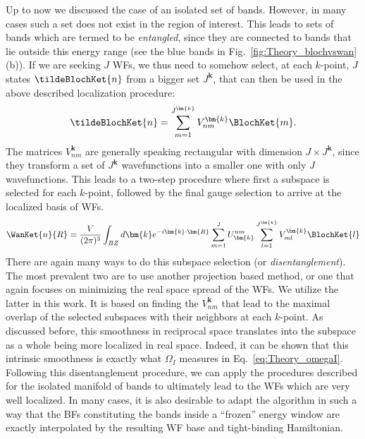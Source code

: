 Up to now we discussed the case of an isolated set of bands.
However, in many cases such a set does not exist in the region of interest.
This leads to sets of bands which are termed to be {\it entangled}, since they are connected to bands that lie outside this energy range (see the blue bands in Fig.~\ref{fig:Theory_blochvswan}(b)).
If we are seeking $J$ WFs, we thus need to somehow select, at each $k$-point, $J$ states $\tildeBlochKet{n}$ from a bigger set $J^{\bm{k}}$, that can then be used in the above described localization procedure:
\begin{equation}
	\tildeBlochKet{n} = \sum_{m=1}^{J^{\bm{k}}}V_{nm}^{\bm{k}} \BlochKet{m}.
\end{equation}
The matrices $V_{nm}^{\bm{k}}$ are generally speaking rectangular with dimension $J\times J^{\bm{k}}$, since they transform a set of $J^{\bm{k}}$ wavefunctions into a smaller one with only $J$ wavefunctions.
This leads to a two-step procedure where first a subspace is selected for each $k$-point, followed by the final gauge selection to arrive at the localized basis of WFs.
\begin{equation}
	\WanKet{n}{R} = \frac{V}{(2\pi)^3} \int_{BZ} d\bm{k} e^{-i \bm{k} \cdot \bm{R}} \sum_{m=1}^J U^{nm}_{\bm{k}} \sum_{l=1}^{J^{\bm{k}}} V_{ml}^{\bm{k}} \BlochKet{l}
\end{equation}
There are again many ways to do this subspace selection (or {\it disentanglement}).
The most prevalent two are to use another projection based method, or one that again focuses on minimizing the real space spread of the WFs.
We utilize the latter in this work.
It is based on finding the $V_{nm}^{\bm{k}}$ that lead to the maximal overlap of the selected subspaces with their neighbors at each $k$-point.
As discussed before, this smoothness in reciprocal space translates into the subspace as a whole being more localized in real space.
Indeed, it can be shown \cite{Marzari2012} that this intrinsic smoothness is exactly what $\Omega_I$ measures in Eq.~\eqref{eq:Theory_omegaI}. 
Following this disentanglement procedure, we can apply the procedures described for the isolated manifold of bands to ultimately lead to the WFs which are very well localized.
In many cases, it is also desirable to adapt the algorithm in such a way that the BFs constituting the bands inside a ``frozen'' energy window are exactly interpolated by the resulting WF base and tight-binding Hamiltonian.

